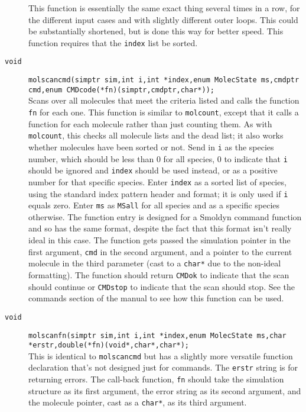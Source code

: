 \documentclass {book}
\begin{document}
\begin{description}
This function is essentially the same exact thing several times in a row, for the different input cases and with slightly different outer loops. This could be substantially shortened, but is done this way for better speed. This function requires that the \texttt{index} list be sorted.

\item[\texttt{void}]
\texttt{molscancmd(simptr sim,int i,int *index,enum MolecState ms,cmdptr cmd,enum CMDcode(*fn)(simptr,cmdptr,char*));}
\hfill \\
Scans over all molecules that meet the criteria listed and calls the function \texttt{fn} for each one. This function is similar to \texttt{molcount}, except that it calls a function for each molecule rather than just counting them. As with \texttt{molcount}, this checks all molecule lists and the dead list; it also works whether molecules have been sorted or not. Send in \texttt{i} as the species number, which should be less than 0 for all species, 0 to indicate that \texttt{i} should be ignored and \texttt{index} should be used instead, or as a positive number for that specific species. Enter \texttt{index} as a sorted list of species, using the standard index pattern header and format; it is only used if \texttt{i} equals zero. Enter \texttt{ms} as \texttt{MSall} for all species and as a specific species otherwise. The function entry is designed for a Smoldyn command function and so has the same format, despite the fact that this format isn't really ideal in this case. The function gets passed the simulation pointer in the first argument, \texttt{cmd} in the second argument, and a pointer to the current molecule in the third parameter (cast to a \texttt{char*} due to the non-ideal formatting). The function should return \texttt{CMDok} to indicate that the scan should continue or \texttt{CMDstop} to indicate that the scan should stop. See the commands section of the manual to see how this function can be used.

\item[\texttt{void}]
\texttt{molscanfn(simptr sim,int i,int *index,enum MolecState ms,char *erstr,double(*fn)(void*,char*,char*);}
\hfill \\
This is identical to \texttt{molscancmd} but has a slightly more versatile function declaration that's not designed just for commands. The \texttt{erstr} string is for returning errors. The call-back function, \texttt{fn} should take the simulation structure as its first argument, the error string as its second argument, and the molecule pointer, cast as a \texttt{char*}, as its third argument.


\end{description}
\end{document}
